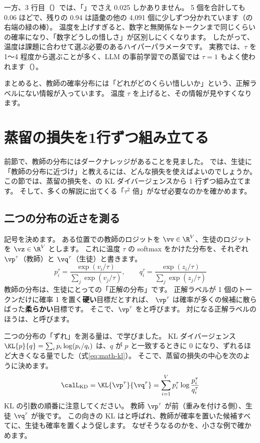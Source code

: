 一方、3 行目（）では、「」でさえ 0.025 しかありません。
5 個を合計しても 0.06 ほどで、残りの 0.94 は語彙の他の 4,091 個に少しずつ分かれています（の右端の緑の棒）。
温度を上げすぎると、数字と無関係なトークンまで同じくらいの確率になり、「数字どうしの惜しさ」が区別しにくくなります。
したがって、温度は課題に合わせて選ぶ必要のあるハイパーパラメータです。
実務では、$\tau$ を 1〜4 程度から選ぶことが多く、LLM の事前学習での蒸留では $\tau=1$ もよく使われます（）。

まとめると、教師の確率分布には「どれがどのくらい惜しいか」という、正解ラベルにない情報が入っています。
温度 $\tau$ を上げると、その情報が見やすくなります。

\section{蒸留の損失を1行ずつ組み立てる}\label{sec:distill-loss}

前節で、教師の分布にはダークナレッジがあることを見ました。
では、生徒に「教師の分布に近づけ」と教えるには、どんな損失を使えばよいのでしょうか。
この節では、蒸留の損失を、の KL ダイバージェンスから 1 行ずつ組み立てます。
そして、多くの解説に出てくる「$\tau^2$ 倍」がなぜ必要なのかを確かめます。

\subsection{二つの分布の近さを測る}\label{sec:distill-kl}

記号を決めます。
ある位置での教師のロジットを $\vv\in\R^V$、生徒のロジットを $\vz\in\R^V$ とします。
これに温度 $\tau$ の softmax をかけた分布を、それぞれ $\vp^\tau$（教師）と $\vq^\tau$（生徒）と書きます。
\begin{equation}
p^\tau_i=\frac{\exp(v_i/\tau)}{\sum_{j}\exp(v_j/\tau)},\qquad
q^\tau_i=\frac{\exp(z_i/\tau)}{\sum_{j}\exp(z_j/\tau)}
\end{equation}
教師の分布は、生徒にとっての「正解の分布」です。
正解ラベルが 1 個のトークンだけに確率 1 を置く\textbf{硬い}目標だとすれば、
$\vp^\tau$ は確率が多くの候補に散らばった\textbf{柔らかい}目標です。
そこで、$\vp^\tau$ をと呼びます。
対になる正解ラベルのほうは、と呼びます。

二つの分布の「ずれ」を測る量は、で学びました。
KL ダイバージェンス $\KL{p}{q}=\sum_i p_i\log(p_i/q_i)$ は、$q$ が $p$ と一致するときに 0 になり、ずれるほど大きくなる量でした（式\eqref{eq:math-kl}）。
そこで、蒸留の損失の中心を次のように決めます。
\begin{equation}
\calL_{\mathrm{KD}}=\KL{\vp^\tau}{\vq^\tau}=\sum_{i=1}^{V}p^\tau_i\log\frac{p^\tau_i}{q^\tau_i}
\label{eq:distill-kl}
\end{equation}
KL の引数の順番に注意してください。
教師 $\vp^\tau$ が前（重みを付ける側）、生徒 $\vq^\tau$ が後です。
この向きの KL はと呼ばれ、教師が確率を置いた候補すべてに、生徒も確率を置くよう促します。
なぜそうなるのかを、小さな例で確かめます。

